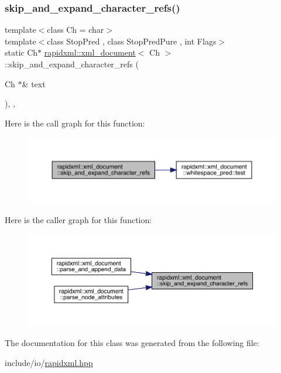 \subsubsection{\texorpdfstring{skip\_and\_expand\_character\_refs()}{skip\_and\_expand\_character\_refs()}}
{\footnotesize\ttfamily template$<$class Ch = char$>$ \\
template$<$class Stop\+Pred , class Stop\+Pred\+Pure , int Flags$>$ \\
static Ch$\ast$ \mbox{\hyperlink{classrapidxml_1_1xml__document}{rapidxml\+::xml\+\_\+document}}$<$ Ch $>$\+::skip\+\_\+and\+\_\+expand\+\_\+character\+\_\+refs (\begin{DoxyParamCaption}\item[{Ch $\ast$\&}]{text }\end{DoxyParamCaption})\hspace{0.3cm}{\ttfamily [inline]}, {\ttfamily [static]}, {\ttfamily [private]}}

Here is the call graph for this function\+:\nopagebreak
\begin{figure}[H]
\begin{center}
\leavevmode
\includegraphics[width=350pt]{classrapidxml_1_1xml__document_af86781975cdfff2105fa8c0b49ab4507_cgraph}
\end{center}
\end{figure}
Here is the caller graph for this function\+:\nopagebreak
\begin{figure}[H]
\begin{center}
\leavevmode
\includegraphics[width=350pt]{classrapidxml_1_1xml__document_af86781975cdfff2105fa8c0b49ab4507_icgraph}
\end{center}
\end{figure}


The documentation for this class was generated from the following file\+:\begin{DoxyCompactItemize}
\item 
include/io/\mbox{\hyperlink{rapidxml_8hpp}{rapidxml.\+hpp}}\end{DoxyCompactItemize}
